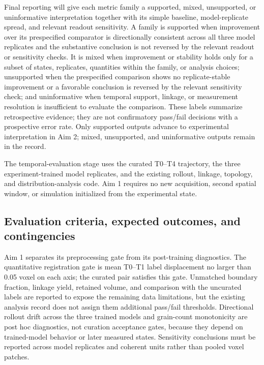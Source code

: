 \documentclass[proposalMode]{ufdissertation}
\begin{document}
Final reporting will give each metric family a supported, mixed, unsupported, or uninformative interpretation together with its simple baseline, model-replicate spread, and relevant readout sensitivity. A family is supported when improvement over its prespecified comparator is directionally consistent across all three model replicates and the substantive conclusion is not reversed by the relevant readout or sensitivity checks. It is mixed when improvement or stability holds only for a subset of states, replicates, quantities within the family, or analysis choices; unsupported when the prespecified comparison shows no replicate-stable improvement or a favorable conclusion is reversed by the relevant sensitivity check; and uninformative when temporal support, linkage, or measurement resolution is insufficient to evaluate the comparison. These labels summarize retrospective evidence; they are not confirmatory pass/fail decisions with a prospective error rate. Only supported outputs advance to experimental interpretation in Aim 2; mixed, unsupported, and uninformative outputs remain in the record.

The temporal-evaluation stage uses the curated T0--T4 trajectory, the three experiment-trained model replicates, and the existing rollout, linkage, topology, and distribution-analysis code. Aim 1 requires no new acquisition, second spatial window, or simulation initialized from the experimental state.

\subsection{Evaluation criteria, expected outcomes, and contingencies}

Aim 1 separates its preprocessing gate from its post-training diagnostics. The quantitative registration gate is mean T0--T1 label displacement no larger than 0.05 voxel on each axis; the curated pair satisfies this gate. Unmatched boundary fraction, linkage yield, retained volume, and comparison with the uncurated labels are reported to expose the remaining data limitations, but the existing analysis record does not assign them additional pass/fail thresholds. Directional rollout drift across the three trained models and grain-count monotonicity are post hoc diagnostics, not curation acceptance gates, because they depend on trained-model behavior or later measured states. Sensitivity conclusions must be reported across model replicates and coherent units rather than pooled voxel patches.
\end{document}
